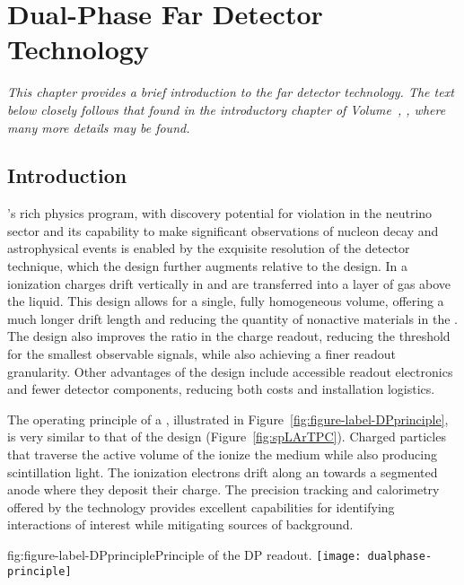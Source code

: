 \chapter{Dual-Phase Far Detector Technology}
\label{ch:exec-dp}

\textit{This chapter provides a brief introduction to the  far detector technology.  The text below closely follows that found in the introductory chapter of Volume~\volnumberdp{}, \voltitledp{}, where many more details may be found.}


\section{Introduction}
\label{sec:dp-execsum-introduction}


's rich physics program, with discovery potential for  violation in the neutrino sector and its capability to make significant observations of nucleon decay and astrophysical events is enabled by the exquisite resolution of the  detector technique, which the  design further augments relative to the  design. 
In a  ionization charges drift vertically in  and are transferred
into a layer of gas above the liquid. This design allows for a single, fully homogeneous  volume, offering a much longer drift length and reducing  the quantity of nonactive materials in the .
The design also improves the  ratio in the charge readout, reducing the threshold for the smallest observable signals, while also achieving a finer readout granularity.  
Other advantages of the  design include accessible readout electronics and fewer detector components, reducing both costs and installation logistics.
  
The operating principle of a  , illustrated in Figure~\ref{fig:figure-label-DPprinciple}, is very similar to that of the  design (Figure~\ref{fig:spLArTPC}).  Charged particles that traverse the active volume of the  ionize the medium while also producing scintillation light. The ionization electrons drift along an \efield towards a segmented anode where they deposit their charge. The precision tracking and calorimetry offered by the  technology provides excellent capabilities for identifying interactions of interest while mitigating sources of background.  

\begin{dunefigure}{fig:figure-label-DPprinciple}{Principle of the DP readout.}
\texttt{[image: dualphase-principle]}
\end{dunefigure}

